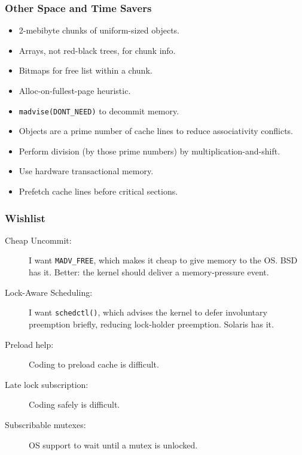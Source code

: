 \documentclass[xcolor=dvipsnames,14pt]{beamer}
\begin{document}
\begin{frame}
\frametitle{Other Space and Time Savers}

\begin{itemize}
\item 2-mebibyte chunks of uniform-sized objects.
\item Arrays, not red-black trees, for chunk info.
\item Bitmaps for free list within a chunk.
\item Alloc-on-fullest-page heuristic.
\item \texttt{madvise(DONT_NEED)} to decommit memory.
\item Objects are a prime number of cache lines to reduce associativity conflicts.
\item Perform division (by those prime numbers) by multiplication-and-shift.
\item Use hardware transactional memory.
\item Prefetch cache lines before critical sections.
\end{itemize}
\end{frame}

\begin{frame}
\frametitle{Wishlist}

\begin{description}
\item[Cheap Uncommit:] I want \texttt{MADV_FREE}, which makes it cheap to give memory to the OS\@.  BSD has it.
 Better: the kernel should deliver a memory-pressure event.
\item[Lock-Aware Scheduling:] I want \texttt{schedctl()}, which advises the kernel to defer
  involuntary preemption briefly, reducing lock-holder preemption.  Solaris has it.
\item[Preload help:] Coding to preload cache is difficult.
\item[Late lock subscription:] Coding safely is difficult.
\item[Subscribable mutexes:] OS support to wait until a mutex is unlocked.
\end{description}
\end{frame}
\end{document}
